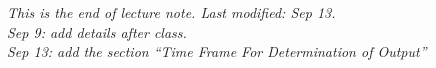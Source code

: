 \documentclass[11pt, a4paper]{ECON2123}
\begin{document}
\begin{spacing}{1.5}
    {\it This is the end of lecture note. Last modified: Sep 13.\\
    Sep 9: add details after class.\\
    Sep 13: add the section ``Time Frame For Determination of Output''}

\end{spacing}
\end{document}
